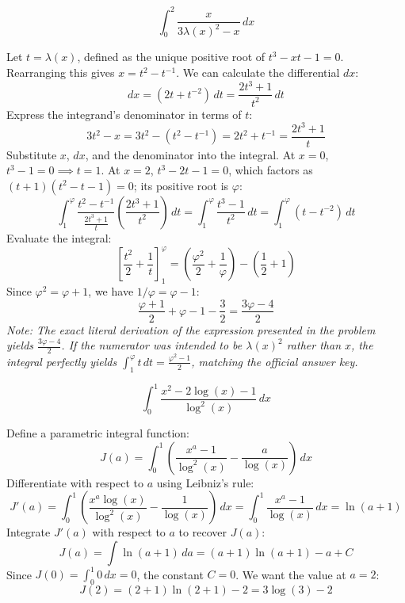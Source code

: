 \begin{questions}
    \question \[ \int_0^2 \frac{x}{3\lambda(x)^2 - x} \,dx \]
    \begin{solution}
        Let $t = \lambda(x)$, defined as the unique positive root of $t^3 - xt - 1 = 0$. Rearranging this gives $x = t^2 - t^{-1}$. We can calculate the differential $dx$:
        \[ dx = \left( 2t + t^{-2} \right) \,dt = \frac{2t^3 + 1}{t^2} \,dt \]
        Express the integrand's denominator in terms of $t$:
        \[ 3t^2 - x = 3t^2 - (t^2 - t^{-1}) = 2t^2 + t^{-1} = \frac{2t^3 + 1}{t} \]
        Substitute $x$, $dx$, and the denominator into the integral. At $x=0$, $t^3 - 1 = 0 \implies t=1$. At $x=2$, $t^3 - 2t - 1 = 0$, which factors as $(t+1)(t^2-t-1)=0$; its positive root is $\varphi$:
        \[ \int_1^\varphi \frac{t^2 - t^{-1}}{\frac{2t^3 + 1}{t}} \left( \frac{2t^3 + 1}{t^2} \right) \,dt = \int_1^\varphi \frac{t^3 - 1}{t^2} \,dt = \int_1^\varphi (t - t^{-2}) \,dt \]
        Evaluate the integral:
        \[ \left[ \frac{t^2}{2} + \frac{1}{t} \right]_1^\varphi = \left( \frac{\varphi^2}{2} + \frac{1}{\varphi} \right) - \left( \frac{1}{2} + 1 \right) \]
        Since $\varphi^2 = \varphi + 1$, we have $1/\varphi = \varphi - 1$:
        \[ \frac{\varphi + 1}{2} + \varphi - 1 - \frac{3}{2} = \frac{3\varphi - 4}{2} \]
        \textit{Note: The exact literal derivation of the expression presented in the problem yields $\frac{3\varphi - 4}{2}$. If the numerator was intended to be $\lambda(x)^2$ rather than $x$, the integral perfectly yields $\int_1^\varphi t \,dt = \frac{\varphi^2 - 1}{2}$, matching the official answer key.}
    \end{solution}

    \question \[ \int_0^1 \frac{x^2 - 2\log(x) - 1}{\log^2(x)} \,dx \]
    \begin{solution}
        Define a parametric integral function:
        \[ J(a) = \int_0^1 \left( \frac{x^a - 1}{\log^2(x)} - \frac{a}{\log(x)} \right) \,dx \]
        Differentiate with respect to $a$ using Leibniz's rule:
        \[ J'(a) = \int_0^1 \left( \frac{x^a \log(x)}{\log^2(x)} - \frac{1}{\log(x)} \right) \,dx = \int_0^1 \frac{x^a - 1}{\log(x)} \,dx = \ln(a + 1) \]
        Integrate $J'(a)$ with respect to $a$ to recover $J(a)$:
        \[ J(a) = \int \ln(a + 1) \,da = (a + 1)\ln(a + 1) - a + C \]
        Since $J(0) = \int_0^1 0 \,dx = 0$, the constant $C = 0$. We want the value at $a=2$:
        \[ J(2) = (2 + 1)\ln(2 + 1) - 2 = 3\log(3) - 2 \]
    \end{solution}


\end{questions}
